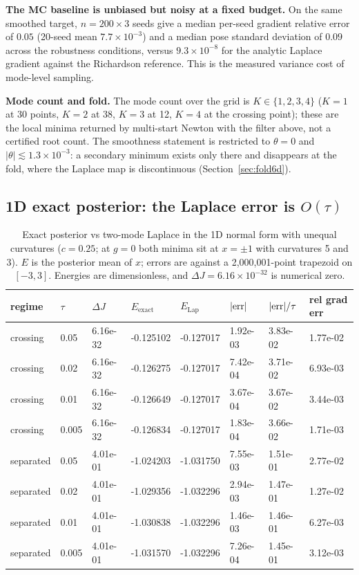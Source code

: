 \textbf{The MC baseline is unbiased but noisy at a fixed budget.} On the same smoothed target, $n=200\times3$ seeds give a median per-seed gradient relative error of $0.05$ (20-seed mean $7.7\times10^{-3}$) and a median pose standard deviation of $0.09$ across the robustness conditions, versus $9.3\times10^{-8}$ for the analytic Laplace gradient against the Richardson reference. This is the measured variance cost of mode-level sampling.

\textbf{Mode count and fold.} The mode count over the grid is $K\in\{1,2,3,4\}$ ($K=1$ at 30 points, $K=2$ at 38, $K=3$ at 12, $K=4$ at the crossing point); these are the local minima returned by multi-start Newton with the filter above, not a certified root count. The smoothness statement is restricted to $\theta=0$ and $|\theta|\lesssim1.3\times10^{-3}$: a secondary minimum exists only there and disappears at the fold, where the Laplace map is discontinuous (Section~\ref{sec:fold6d}).

\subsection{1D exact posterior: the Laplace error is \texorpdfstring{$O(\tau)$}{O(tau)}}\label{sec:onepd}

\begin{table}[t]
\centering
\caption{Exact posterior vs two-mode Laplace in the 1D normal form with unequal curvatures ($c=0.25$; at $g=0$ both minima sit at $x=\pm1$ with curvatures 5 and 3). $E$ is the posterior mean of $x$; errors are against a 2{,}000{,}001-point trapezoid on $[-3,3]$. Energies are dimensionless, and $\Delta J=6.16\times10^{-32}$ is numerical zero.}
\label{tab:1d}
\footnotesize
\setlength{\tabcolsep}{5pt}
\begin{tabular}{@{}l l l l l l l l@{}}
\toprule
regime & $\tau$ & $\Delta J$ & $E_{\mathrm{exact}}$ & $E_{\mathrm{Lap}}$ & $|{\rm err}|$ & $|{\rm err}|/\tau$ & rel grad err\\
\midrule
crossing & 0.05 & 6.16e-32 & -0.125102 & -0.127017 & 1.92e-03 & 3.83e-02 & 1.77e-02\\
crossing & 0.02 & 6.16e-32 & -0.126275 & -0.127017 & 7.42e-04 & 3.71e-02 & 6.93e-03\\
crossing & 0.01 & 6.16e-32 & -0.126649 & -0.127017 & 3.67e-04 & 3.67e-02 & 3.44e-03\\
crossing & 0.005 & 6.16e-32 & -0.126834 & -0.127017 & 1.83e-04 & 3.66e-02 & 1.71e-03\\
separated & 0.05 & 4.01e-01 & -1.024203 & -1.031750 & 7.55e-03 & 1.51e-01 & 2.77e-02\\
separated & 0.02 & 4.01e-01 & -1.029356 & -1.032296 & 2.94e-03 & 1.47e-01 & 1.27e-02\\
separated & 0.01 & 4.01e-01 & -1.030838 & -1.032296 & 1.46e-03 & 1.46e-01 & 6.27e-03\\
separated & 0.005 & 4.01e-01 & -1.031570 & -1.032296 & 7.26e-04 & 1.45e-01 & 3.12e-03\\
\bottomrule
\end{tabular}
\end{table}

